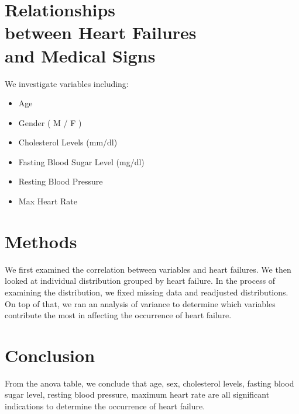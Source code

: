 \documentclass[a0paper,fleqn]{betterposter}
\begin{document}
{\section{Relationships \\between Heart Failures \\and Medical Signs }
We investigate variables including: 
\begin{itemize}
\item Age
\item Gender ( M / F )
\item Cholesterol Levels (mm/dl)
\item Fasting Blood Sugar Level (mg/dl)
\item Resting Blood Pressure
\item Max Heart Rate
\end{itemize}

\section{Methods}
We first examined the correlation between variables and heart failures. We then looked at individual distribution grouped by heart failure. In the process of examining the distribution, we fixed missing data and readjusted distributions. On top of that, we ran an analysis of variance to determine which variables contribute the most in affecting the occurrence of heart failure.

\section{Conclusion}
From the anova table, we conclude that age, sex, cholesterol levels, fasting blood sugar level, resting blood pressure, maximum heart rate are all significant indications to determine the occurrence of heart failure.\




}{
}
\end{document}
